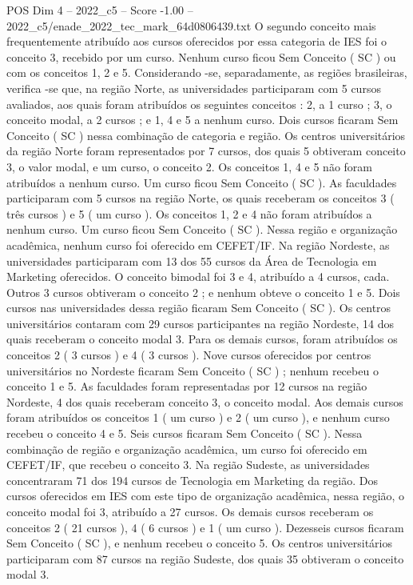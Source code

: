 \begin{textsample}{POS Dim 4 – 2022\_c5 – Score -1.00 – 2022\_c5/enade\_2022\_tec\_mark\_64d0806439.txt}
O segundo conceito mais frequentemente atribuído aos cursos oferecidos por essa categoria de IES foi o conceito 3, recebido por um curso.
Nenhum curso ficou Sem Conceito ( SC ) ou com os conceitos 1, 2 e 5.
Considerando -se, separadamente, as regiões brasileiras, verifica -se que, na região Norte, as universidades participaram com 5 cursos avaliados, aos quais foram atribuídos os seguintes conceitos : 2, a 1 curso ; 3, o conceito modal, a 2 cursos ; e 1, 4 e 5 a nenhum curso.
Dois cursos ficaram Sem Conceito ( SC ) nessa combinação de categoria e região.
Os centros universitários da região Norte foram representados por 7 cursos, dos quais 5 obtiveram conceito 3, o valor modal, e um curso, o conceito 2.
Os conceitos 1, 4 e 5 não foram atribuídos a nenhum curso.
Um curso ficou Sem Conceito ( SC ).
As faculdades participaram com 5 cursos na região Norte, os quais receberam os conceitos 3 ( três cursos ) e 5 ( um curso ).
Os conceitos 1, 2 e 4 não foram atribuídos a nenhum curso.
Um curso ficou Sem Conceito ( SC ).
Nessa região e organização acadêmica, nenhum curso foi oferecido em CEFET/IF.
Na região Nordeste, as universidades participaram com 13 dos 55 cursos da Área de Tecnologia em Marketing oferecidos.
O conceito bimodal foi 3 e 4, atribuído a 4 cursos, cada.
Outros 3 cursos obtiveram o conceito 2 ; e nenhum obteve o conceito 1 e 5.
Dois cursos nas universidades dessa região ficaram Sem Conceito ( SC ).
Os centros universitários contaram com 29 cursos participantes na região Nordeste, 14 dos quais receberam o conceito modal 3.
Para os demais cursos, foram atribuídos os conceitos 2 ( 3 cursos ) e 4 ( 3 cursos ).
Nove cursos oferecidos por centros universitários no Nordeste ficaram Sem Conceito ( SC ) ; nenhum recebeu o conceito 1 e 5.
As faculdades foram representadas por 12 cursos na região Nordeste, 4 dos quais receberam conceito 3, o conceito modal.
Aos demais cursos foram atribuídos os conceitos 1 ( um curso ) e 2 ( um curso ), e nenhum curso recebeu o conceito 4 e 5.
Seis cursos ficaram Sem Conceito ( SC ).
Nessa combinação de região e organização acadêmica, um curso foi oferecido em CEFET/IF, que recebeu o conceito 3.
Na região Sudeste, as universidades concentraram 71 dos 194 cursos de Tecnologia em Marketing da região.
Dos cursos oferecidos em IES com este tipo de organização acadêmica, nessa região, o conceito modal foi 3, atribuído a 27 cursos.
Os demais cursos receberam os conceitos 2 ( 21 cursos ), 4 ( 6 cursos ) e 1 ( um curso ).
Dezesseis cursos ficaram Sem Conceito ( SC ), e nenhum recebeu o conceito 5.
Os centros universitários participaram com 87 cursos na região Sudeste, dos quais 35 obtiveram o conceito modal 3.

\end{textsample}
